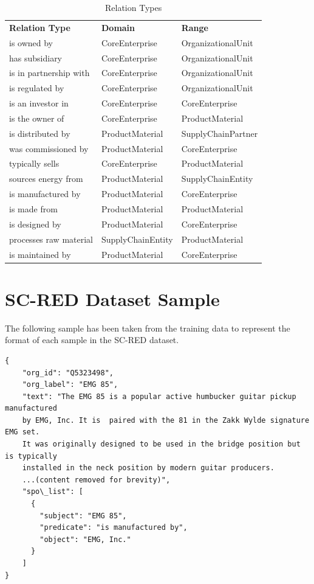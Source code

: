\begin{table}[h]
\centering 
\caption{Relation Types}
\label{tab:relation_types}
\begin{tabular}{lll}
\textbf{Relation Type} & \textbf{Domain} & \textbf{Range}\\
is owned by               & CoreEnterprise      & OrganizationalUnit\\
  has subsidiary            & CoreEnterprise      & OrganizationalUnit\\
  is in partnership with    & CoreEnterprise      & OrganizationalUnit\\
  is regulated by           & CoreEnterprise      & OrganizationalUnit\\
  is an investor in         & CoreEnterprise      & CoreEnterprise\\
  is the owner of           & CoreEnterprise      & ProductMaterial\\
  is distributed by         & ProductMaterial     & SupplyChainPartner\\
  was commissioned by       & ProductMaterial     & CoreEnterprise\\
  typically sells           & CoreEnterprise      & ProductMaterial\\
  sources energy from       & ProductMaterial     & SupplyChainEntity\\
  is manufactured by        & ProductMaterial     & CoreEnterprise\\
  is made from              & ProductMaterial     & ProductMaterial\\
  is designed by            & ProductMaterial     & CoreEnterprise\\
  processes raw material    & SupplyChainEntity   & ProductMaterial\\
  is maintained by          & ProductMaterial     & CoreEnterprise\\
\end{tabular}
\end{table}

\section{SC-RED Dataset Sample}
\label{app:scred_sample}

The following sample has been taken from the training data to represent the format of each sample in the SC-RED dataset. 

\begin{verbatim}
{
    "org_id": "Q5323498",
    "org_label": "EMG 85",
    "text": "The EMG 85 is a popular active humbucker guitar pickup manufactured 
    by EMG, Inc. It is  paired with the 81 in the Zakk Wylde signature EMG set. 
    It was originally designed to be used in the bridge position but is typically 
    installed in the neck position by modern guitar producers.
    ...(content removed for brevity)",
    "spo\_list": [
      {
        "subject": "EMG 85",
        "predicate": "is manufactured by",
        "object": "EMG, Inc."
      }
    ]
}
\end{verbatim}

